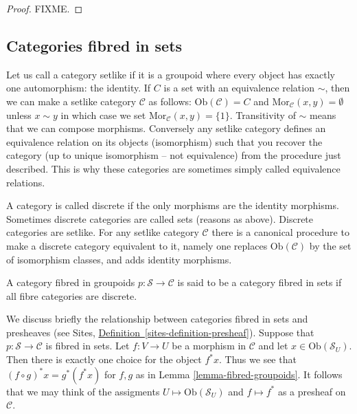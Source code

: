 \begin{proof} 
FIXME.
\end{proof}

\subsection{Categories fibred in sets}
\label{subsection-fibred-in-sets}

\noindent
Let us call a category setlike if it is a groupoid where every object
has exactly one automorphism: the identity. If $C$ is a set with an 
equivalence relation $\sim$, then we can make a setlike category
$\mathcal{C}$ as follows: $\text{Ob}(\mathcal{C}) = C$ and 
$\text{Mor}_\mathcal{C}(x,y) = \emptyset$ unless $x \sim y$ in which
case we set $\text{Mor}_\mathcal{C}(x,y) = \{1\}$. Transitivity of
$\sim$ means that we can compose morphisms. Conversely any setlike
category defines an equivalence relation on its objects (isomorphism)
such that you recover the category (up to unique isomorphism -- not
equivalence) from the procedure just described. This is why these categories
are sometimes simply called equivalence relations.

\smallskip\noindent
A category is called discrete if the only morphisms are the identity 
morphisms. Sometimes discrete categories are called sets (reasons as above).
Discrete categories are setlike. For any setlike category $\mathcal{C}$
there is a canonical procedure to make a discrete category equivalent to it,
namely one replaces $\text{Ob}(\mathcal{C})$ by the set of isomorphism
classes, and adds identity morphisms.

\begin{definition}
\label{definition-category-fibred-sets}
A category fibred in groupoids $p : \mathcal{S} \to \mathcal{C}$ is said
to be a category fibred in sets if all fibre categories are discrete.
\end{definition}

\noindent
We discuss briefly the relationship between categories fibred in sets
and presheaves (see Sites, \hyperref[sites-definition-presheaf]%
{Definition~\ref*{sites-definition-presheaf}}). Suppose that $p :
\mathcal{S} \to \mathcal{C}$ is fibred in sets. Let $f : V \to U$
be a morphism in $\mathcal{C}$ and let $x \in \text{Ob}(\mathcal{S}_U)$.
Then there is exactly one choice for the object $f^\ast x$. Thus we see that
$(f \circ g)^\ast x = g^\ast(f^\ast x)$ for $f,g$ as in Lemma
\ref{lemma-fibred-groupoids}. It follows that we may think of the
assigments $U \mapsto \text{Ob}(\mathcal{S}_U)$ and $f \mapsto f^\ast$
as a presheaf on $\mathcal{C}$.

